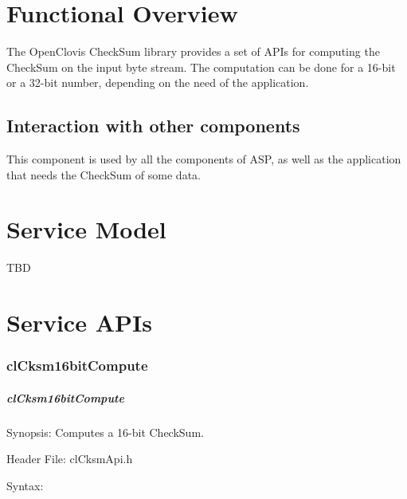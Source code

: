 \hypertarget{group__group37}{
\chapter{Functional Overview}
\label{group__group37}
}

\begin{flushleft}
The OpenClovis CheckSum library provides a set of APIs for computing the CheckSum on the input byte stream. The computation can be done for a 16-bit or a 
32-bit number, depending on the need of the application.
\section{Interaction with other components} This component is used by all the components of ASP, as well as the application that needs the CheckSum of
some data.

\chapter{Service Model}
TBD


\chapter{Service APIs}





\subsection{clCksm16bitCompute}
 \hypertarget{pagecksm101}{}\paragraph{cl\-Cksm16bit\-Compute}\label{pagecksm101}
\begin{Desc}
\item[Synopsis:]Computes a 16-bit CheckSum.\end{Desc}
\begin{Desc}
\item[Header File:]clCksmApi.h\end{Desc}
\begin{Desc}
\item[Syntax:]


\end{Desc}
\end{flushleft}
